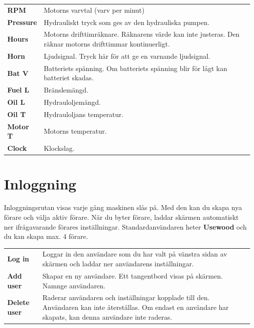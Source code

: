 \documentclass[12pt,a4paper,finnish]{uvmanual}
\begin{document}

\begin{tabular}{ L{0.2\textwidth} L{0.66\textwidth} }
\textbf{RPM} & Motorns varvtal (varv per minut) \\
\textbf{Pressure} & Hydrauliskt tryck som ges av den hydrauliska pumpen. \\
\textbf{Hours} & Motorns drifttimräknare. Räknarens värde kan inte justeras. Den räknar motorns drifttimmar kontinuerligt. \\
\textbf{Horn} & Ljudsignal. Tryck här för att ge en varnande ljudsignal. \\
\textbf{Bat V} & Batteriets spänning. Om batteriets spänning blir för lågt kan batteriet skadas. \\
\textbf{Fuel L} & Bränslemängd. \\
\textbf{Oil L} & Hydrauloljemängd. \\
\textbf{Oil T} & Hydrauloljans temperatur. \\
\textbf{Motor T} & Motorns temperatur. \\
\textbf{Clock} & Klockslag. \\
\end{tabular}


\chapter{Inloggning}\label{ch:login}

Inloggningsrutan visas varje gång maskinen slås på. Med den kan du skapa nya förare och välja aktiv förare. När du byter förare, laddar skärmen automatiskt ner ifrågavarande förares inställningar. Standardanvändaren heter \textbf{Usewood} och du kan skapa max. 4 förare.


\begin{tabular}{ L{0.2\textwidth} L{0.66\textwidth} }
\textbf{Log in} & Loggar in den användare som du har valt på vänstra sidan av skärmen och laddar ner användarens inställningar. \\
\textbf{Add user} & Skapar en ny användare. Ett tangentbord visas på skärmen. Namnge användaren. \\
\textbf{Delete user} & Raderar användaren och inställningar kopplade till den. Användaren kan inte återställas. Om endast en användare har skapats, kan denna användare inte raderas. \\
\end{tabular}
\end{document}
